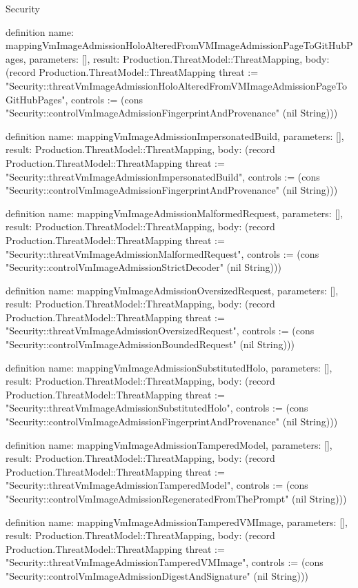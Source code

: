 \begin{lexlean}{Security}
\begin{semanticmodule}
definition{
  name: mappingVmImageAdmissionHoloAlteredFromVMImageAdmissionPageToGitHubPages,
  parameters: [],
  result: Production.ThreatModel::ThreatMapping,
  body: (record Production.ThreatModel::ThreatMapping {threat := "Security::threatVmImageAdmissionHoloAlteredFromVMImageAdmissionPageToGitHubPages", controls := (cons "Security::controlVmImageAdmissionFingerprintAndProvenance" (nil String))})
}

definition{
  name: mappingVmImageAdmissionImpersonatedBuild,
  parameters: [],
  result: Production.ThreatModel::ThreatMapping,
  body: (record Production.ThreatModel::ThreatMapping {threat := "Security::threatVmImageAdmissionImpersonatedBuild", controls := (cons "Security::controlVmImageAdmissionFingerprintAndProvenance" (nil String))})
}

definition{
  name: mappingVmImageAdmissionMalformedRequest,
  parameters: [],
  result: Production.ThreatModel::ThreatMapping,
  body: (record Production.ThreatModel::ThreatMapping {threat := "Security::threatVmImageAdmissionMalformedRequest", controls := (cons "Security::controlVmImageAdmissionStrictDecoder" (nil String))})
}

definition{
  name: mappingVmImageAdmissionOversizedRequest,
  parameters: [],
  result: Production.ThreatModel::ThreatMapping,
  body: (record Production.ThreatModel::ThreatMapping {threat := "Security::threatVmImageAdmissionOversizedRequest", controls := (cons "Security::controlVmImageAdmissionBoundedRequest" (nil String))})
}

definition{
  name: mappingVmImageAdmissionSubstitutedHolo,
  parameters: [],
  result: Production.ThreatModel::ThreatMapping,
  body: (record Production.ThreatModel::ThreatMapping {threat := "Security::threatVmImageAdmissionSubstitutedHolo", controls := (cons "Security::controlVmImageAdmissionFingerprintAndProvenance" (nil String))})
}

definition{
  name: mappingVmImageAdmissionTamperedModel,
  parameters: [],
  result: Production.ThreatModel::ThreatMapping,
  body: (record Production.ThreatModel::ThreatMapping {threat := "Security::threatVmImageAdmissionTamperedModel", controls := (cons "Security::controlVmImageAdmissionRegeneratedFromThePrompt" (nil String))})
}

definition{
  name: mappingVmImageAdmissionTamperedVMImage,
  parameters: [],
  result: Production.ThreatModel::ThreatMapping,
  body: (record Production.ThreatModel::ThreatMapping {threat := "Security::threatVmImageAdmissionTamperedVMImage", controls := (cons "Security::controlVmImageAdmissionDigestAndSignature" (nil String))})
}


\end{semanticmodule}
\end{lexlean}
